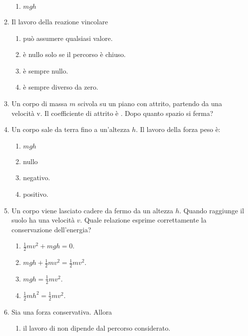 \documentclass{article}
\begin{document}
\begin{enumerate}
\begin{enumerate}[label=\Alph*.]
    \item $mgh$
  \end{enumerate}
  \item Il lavoro della reazione vincolare
  \begin{enumerate}[label=\Alph*.]
    \item può assumere qualsiasi valore.
    \item è nullo solo se il percorso è chiuso.
    \item è sempre nullo.
    \item è sempre diverso da zero.
  \end{enumerate}
  \item Un corpo di massa $m$ scivola su un piano con attrito, partendo da una velocità v. Il coefficiente di attrito è \mu. Dopo quanto spazio si ferma?
  \begin{enumerate}[label=\Alph*.]
    \item $\frac{1}{2}v^2+\mu g$.
    \item $\frac{v^2}{2g\mu}}$.
    \item $\frac{2v^2}{g\mu}}$.
    \item $\frac{1}{2}v^2-\mu g$.
  \end{enumerate}
  \item Un corpo sale da terra fino a un'altezza $h$. Il lavoro della forza peso è:
  \begin{enumerate}[label=\Alph*.]
    \item $mgh$
    \item nullo
    \item negativo.
    \item positivo.
  \end{enumerate}
  \item Un corpo viene lasciato cadere da fermo da un altezza $h$. Quando raggiunge il suolo ha una velocità $v$. Quale relazione esprime correttamente la conservazione dell'energia?
  \begin{enumerate}[label=\Alph*.]
    \item $\frac{1}{2}mv^2+mgh=0.$
    \item $mgh+\frac{1}{2}mv^2=\frac{1}{2}mv^2.$
    \item $mgh=\frac{1}{2}mv^2$.
    \item $\frac{1}{2}mh^2=\frac{1}{2}mv^2$.
  \end{enumerate}
  \item Sia  una forza conservativa. Allora
  \begin{enumerate}[label=\Alph*.]
    \item il lavoro di  non dipende dal percorso considerato.

\end{enumerate}
\end{enumerate}
\end{document}
